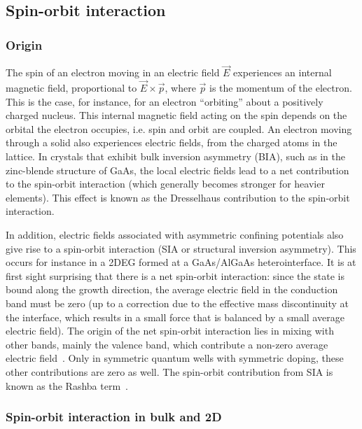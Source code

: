 \documentclass[12pt,aps,nofootinbib]{revtex4-1}
\begin{document}

\subsection{Spin-orbit interaction}
\label{Sec:spin-orbit}
\subsubsection{Origin}

The spin of an electron moving in an electric field $\vec{E}$
experiences an internal magnetic field, proportional to $\vec{E}
\times \vec{p}$, where $\vec{p}$ is the momentum of the electron.
This is the case, for instance, for an electron ``orbiting'' about
a positively charged nucleus. This internal magnetic field acting
on the spin depends on the orbital the electron occupies, i.e.
spin and orbit are coupled. An electron moving through a solid
also experiences electric fields, from the charged atoms in the
lattice. In crystals that exhibit bulk inversion asymmetry (BIA), such as in the zinc-blende structure of GaAs, the local electric fields lead to a net contribution to the spin-orbit interaction (which generally becomes stronger for heavier elements). This effect is  known as the Dresselhaus contribution to the spin-orbit interaction\cite{dresselhaus55,dyakonov86,wrinkler03}.

In addition, electric fields associated with asymmetric confining
potentials also give rise to a spin-orbit interaction (SIA or
structural inversion asymmetry). This occurs for instance in a
2DEG formed at a GaAs/AlGaAs heterointerface. It is at first sight surprising that there is a net spin-orbit interaction: since the state is bound along the growth direction, the average electric field in the conduction band must be zero (up to a correction due to the effective mass discontinuity at the interface, which results in a small force that is balanced by a small average electric field). The origin of the net spin-orbit interaction lies in mixing with other bands, mainly the valence band, which contribute a non-zero average electric field~\cite{wrinkler03,pfeffer99}.
Only in symmetric quantum wells with symmetric doping, these other contributions are zero as well. The spin-orbit contribution from SIA is known as the Rashba term~\cite{rashba60,bychkov84}.


\subsubsection{Spin-orbit interaction in bulk and 2D}
\label{sec:SO_bulk_2D}
\end{document}
